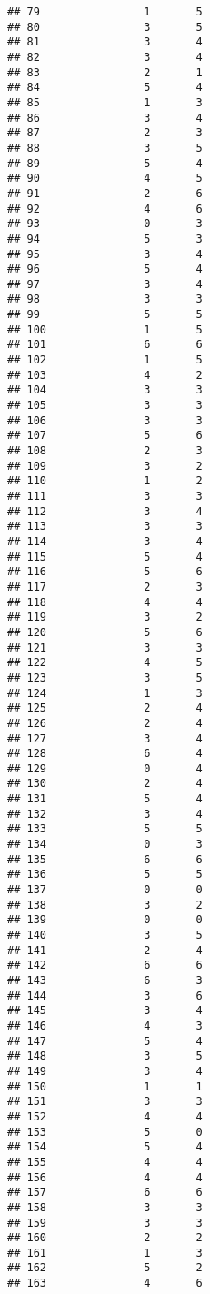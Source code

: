 \documentclass[
]{article}
\begin{document}
\begin{verbatim}
## 79                1       5
## 80                3       5
## 81                3       4
## 82                3       4
## 83                2       1
## 84                5       4
## 85                1       3
## 86                3       4
## 87                2       3
## 88                3       5
## 89                5       4
## 90                4       5
## 91                2       6
## 92                4       6
## 93                0       3
## 94                5       3
## 95                3       4
## 96                5       4
## 97                3       4
## 98                3       3
## 99                5       5
## 100               1       5
## 101               6       6
## 102               1       5
## 103               4       2
## 104               3       3
## 105               3       3
## 106               3       3
## 107               5       6
## 108               2       3
## 109               3       2
## 110               1       2
## 111               3       3
## 112               3       4
## 113               3       3
## 114               3       4
## 115               5       4
## 116               5       6
## 117               2       3
## 118               4       4
## 119               3       2
## 120               5       6
## 121               3       3
## 122               4       5
## 123               3       5
## 124               1       3
## 125               2       4
## 126               2       4
## 127               3       4
## 128               6       4
## 129               0       4
## 130               2       4
## 131               5       4
## 132               3       4
## 133               5       5
## 134               0       3
## 135               6       6
## 136               5       5
## 137               0       0
## 138               3       2
## 139               0       0
## 140               3       5
## 141               2       4
## 142               6       6
## 143               6       3
## 144               3       6
## 145               3       4
## 146               4       3
## 147               5       4
## 148               3       5
## 149               3       4
## 150               1       1
## 151               3       3
## 152               4       4
## 153               5       0
## 154               5       4
## 155               4       4
## 156               4       4
## 157               6       6
## 158               3       3
## 159               3       3
## 160               2       2
## 161               1       3
## 162               5       2
## 163               4       6
\end{verbatim}
\end{document}
